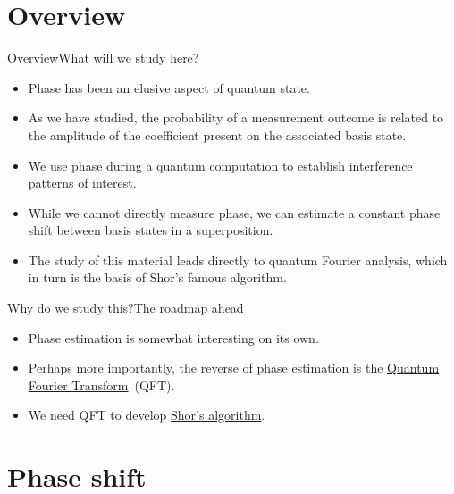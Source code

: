 
\section*{Overview}
\begin{frame}{Overview}{What will we study here?}

\begin{itemize}[<+->]
    \item Phase has been an elusive aspect of quantum state.
    \item As we have studied, the probability of a measurement outcome is related to the amplitude of the coefficient present on the associated basis state.
    \item We use phase during a quantum computation to establish interference patterns of interest.
    \item While we cannot directly measure phase, we can estimate a constant phase shift between basis states in a superposition.
    \item The study of this material leads directly to quantum Fourier analysis, which in turn is the basis of Shor's famous algorithm.
\end{itemize}
    
\end{frame}

\begin{frame}{Why do we study this?}{The roadmap ahead}

\begin{itemize}[<+->]
    \item Phase estimation is somewhat interesting on its own.
    \item Perhaps more importantly, the reverse of phase estimation is the \href{https://en.wikipedia.org/wiki/Quantum_Fourier_transform}{Quantum Fourier Transform}~(QFT).
    \item We need QFT to develop \href{https://en.wikipedia.org/wiki/Shor\%27s_algorithm}{Shor's algorithm}.
\end{itemize}
    
\end{frame}

\section*{Phase shift}

